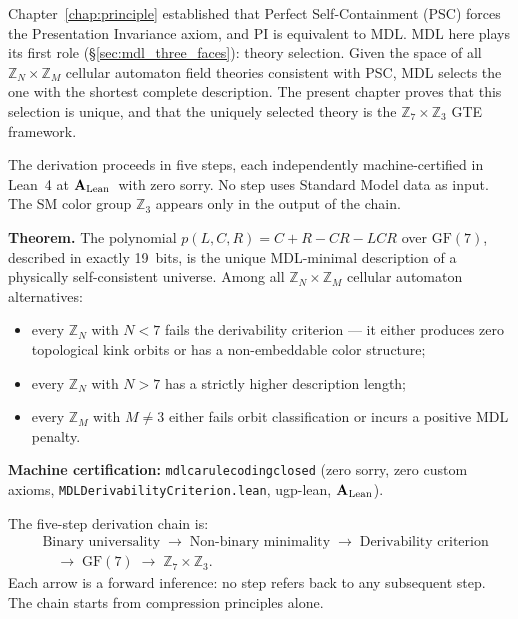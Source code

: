 \documentclass[11pt,openany]{book}
\theoremstyle{remark}
\newcommand{\lean}[1]{%
  \penalty-100
  \begingroup\def\_{\textunderscore\allowbreak}\texttt{#1}\endgroup}
\newcommand{\poly}{p(L,C,R)}
\newcommand{\CatAL}{\ensuremath{\textbf{A}_{\rm Lean}}}
\begin{document}
Chapter~\ref{chap:principle} established that Perfect Self-Containment (PSC) forces
the Presentation Invariance axiom, and PI is equivalent to MDL\@. MDL here plays
its first role (\S\ref{sec:mdl_three_faces}): theory selection. Given the space of
all $\mathbb{Z}_N\times\mathbb{Z}_M$ cellular automaton field theories consistent with
PSC, MDL selects the one with the shortest complete description. The present chapter
proves that this selection is unique, and that the uniquely selected theory is the
$\mathbb{Z}_7\times\mathbb{Z}_3$ GTE framework.

The derivation proceeds in five steps, each independently machine-certified in
Lean~4 at \CatAL\ with zero sorry. No step uses Standard Model data as input. The
SM color group $\mathbb{Z}_3$ appears only in the output of the chain.

\begin{tcolorbox}[colback=orange!5,colframe=orange!60,
  title={Theorem: The MDL Uniqueness Theorem (\CatAL, zero sorry, zero custom axioms)}]
\textbf{Theorem.}
The polynomial $\poly = C+R-CR-LCR$ over $\mathrm{GF}(7)$, described in exactly
19~bits, is the unique MDL-minimal description of a physically self-consistent universe.
Among all $\mathbb{Z}_N\times\mathbb{Z}_M$ cellular automaton alternatives:
\begin{itemize}[itemsep=2pt]
\item every $\mathbb{Z}_N$ with $N < 7$ fails the derivability criterion --- it either
  produces zero topological kink orbits or has a non-embeddable color structure;
\item every $\mathbb{Z}_N$ with $N > 7$ has a strictly higher description length;
\item every $\mathbb{Z}_M$ with $M \neq 3$ either fails orbit classification or
  incurs a positive MDL penalty.
\end{itemize}
\textbf{Machine certification:}
\lean{mdl\_ca\_rule\_coding\_closed} (zero sorry, zero custom axioms,
\texttt{MDLDerivabilityCriterion.lean}, ugp-lean, \CatAL).
\end{tcolorbox}

\noindent
The five-step derivation chain is:
\begin{align*}
&\text{Binary universality}
\;\longrightarrow\;
\text{Non-binary minimality}
\;\longrightarrow\;
\text{Derivability criterion}\\
&\quad\longrightarrow\;
\mathrm{GF}(7)
\;\longrightarrow\;
\mathbb{Z}_7\times\mathbb{Z}_3.
\end{align*}
Each arrow is a forward inference: no step refers back to any subsequent step.
The chain starts from compression principles alone.
\end{document}
